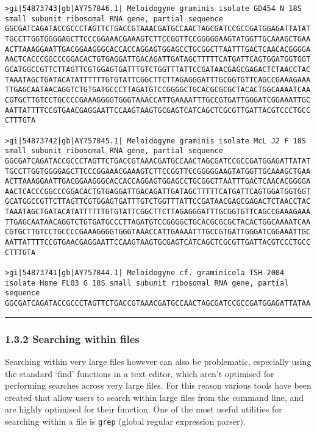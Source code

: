 \documentclass[11pt]{article}
\begin{document}
\begin{Verbatim}[commandchars=\\\{\}]
>gi|54873743|gb|AY757846.1| Meloidogyne graminis isolate GD454 N 18S small subunit ribosomal RNA gene, partial sequence
GGCGATCAGATACCGCCCTAGTTCTGACCGTAAACGATGCCAACTAGCGATCCGCCGATGGAGATTATAT
TGCCTTGGTGGGGAGCTTCCCGGAAACGAAAGTCTTCCGGTTCCGGGGGAAGTATGGTTGCAAAGCTGAA
ACTTAAAGGAATTGACGGAAGGGCACCACCAGGAGTGGAGCCTGCGGCTTAATTTGACTCAACACGGGGA
AACTCACCCGGCCCGGACACTGTGAGGATTGACAGATTGATAGCTTTTTCATGATTCAGTGGATGGTGGT
GCATGGCCGTTCTTAGTTCGTGGAGTGATTTGTCTGGTTTATTCCGATAACGAGCGAGACTCTAACCTAC
TAAATAGCTGATACATATTTTTTGTGTATTCGGCTTCTTAGAGGGATTTGCGGTGTTCAGCCGAAAGAAA
TTGAGCAATAACAGGTCTGTGATGCCCTTAGATGTCCGGGGCTGCACGCGCGCTACACTGGCAAAATCAA
CGTGCTTGTCCTGCCCCGAAAGGGGTGGGTAAACCATTGAAAATTTGCCGTGATTGGGATCGGAAATTGC
AATTATTTTCCGTGAACGAGGAATTCCAAGTAAGTGCGAGTCATCAGCTCGCGTTGATTACGTCCCTGCC
CTTTGTA

>gi|54873742|gb|AY757845.1| Meloidogyne graminis isolate McL J2 F 18S small subunit ribosomal RNA gene, partial sequence
GGCGATCAGATACCGCCCTAGTTCTGACCGTAAACGATGCCAACTAGCGATCCGCCGATGGAGATTATAT
TGCCTTGGTGGGGAGCTTCCCGGAAACGAAAGTCTTCCGGTTCCGGGGGAAGTATGGTTGCAAAGCTGAA
ACTTAAAGGAATTGACGGAAGGGCACCACCAGGAGTGGAGCCTGCGGCTTAATTTGACTCAACACGGGGA
AACTCACCCGGCCCGGACACTGTGAGGATTGACAGATTGATAGCTTTTTCATGATTCAGTGGATGGTGGT
GCATGGCCGTTCTTAGTTCGTGGAGTGATTTGTCTGGTTTATTCCGATAACGAGCGAGACTCTAACCTAC
TAAATAGCTGATACATATTTTTTGTGTATTCGGCTTCTTAGAGGGATTTGCGGTGTTCAGCCGAAAGAAA
TTGAGCAATAACAGGTCTGTGATGCCCTTAGATGTCCGGGGCTGCACGCGCGCTACACTGGCAAAATCAA
CGTGCTTGTCCTGCCCCGAAAGGGGTGGGTAAACCATTGAAAATTTGCCGTGATTGGGATCGGAAATTGC
AATTATTTTCCGTGAACGAGGAATTCCAAGTAAGTGCGAGTCATCAGCTCGCGTTGATTACGTCCCTGCC
CTTTGTA

>gi|54873741|gb|AY757844.1| Meloidogyne cf. graminicola TSH-2004 isolate Home FL03 G 18S small subunit ribosomal RNA gene, partial sequence
GGCGATCAGATACCGCCCTAGTTCTGACCGTAAACGATGCCAACTAGCGATCCGCCGATGGAGATTATAA

    \end{Verbatim}

    \begin{center}\rule{0.5\linewidth}{\linethickness}\end{center}

    \hypertarget{searching-within-files}{%
\subsubsection{1.3.2 Searching within
files}\label{searching-within-files}}

Searching within very large files however can also be problematic,
especially using the standard `find' functions in a text editor, which
aren't optimised for performing searches across very large files. For
this reason various tools have been created that allow users to search
within large files from the command line, and are highly optimised for
their function. One of the most useful utilities for searching within a
file is \texttt{grep} (global regular expression parser).
\end{document}
